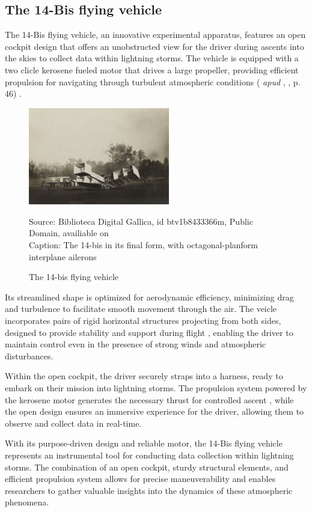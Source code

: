 \documentclass[english]{cenarticle}
\newcommand{\citeapud}[3]{
  (\citeauthor{#1} {\it apud} \citeauthor{#2}, \citeyear{#2}, p. #3)
}
\begin{document}
\subsection{The 14-Bis flying vehicle}
The 14-Bis flying vehicle, an innovative experimental apparatus, features an open cockpit design that offers an unobstructed view for the driver during ascents into the skies to collect data within lightning storms. The vehicle is equipped with a two clicle kerosene fueled motor \citep{Torrens1992} that drives a large propeller, providing efficient propulsion for navigating through turbulent atmospheric conditions \citeapud{Pimenta1987}{Torrens1992}{46}.
%
\begin{figure}[!h]
  \caption{The 14-bis flying vehicle}
  \vspace{-3mm} 
  \begin{center}
    \includegraphics[width=0.55\textwidth, trim={0 0 0 0},clip]{images/14-bis.jpeg}
  \end{center}
  {\footnotesize
  Source: Biblioteca Digital Gallica, id btv1b8433366m, Public Domain, availiable on \citep{Beau1907}\\
  Caption: The 14-bis in its final form, with octagonal-planform interplane ailerons}
    \label{fig:triangle2}
\end{figure}
%
Its streamlined shape is optimized for aerodynamic efficiency, minimizing drag and turbulence to facilitate smooth movement through the air. The veicle incorporates pairs of rigid horizontal structures projecting from both sides, designed to provide stability and support during flight \citep{Wipo}, enabling the driver to maintain control even in the presence of strong winds and atmospheric disturbances.\par
%
Within the open cockpit, the driver securely straps into a harness, ready to embark on their mission into lightning storms. The propulsion system powered by the kerosene motor generates the necessary thrust for controlled ascent \citep{Torrens1992}, while the open design ensures an immersive experience for the driver, allowing them to observe and collect data in real-time.\par
%
With its purpose-driven design and reliable motor, the 14-Bis flying vehicle represents an instrumental tool for conducting data collection within lightning storms. The combination of an open cockpit, sturdy structural elements, and efficient propulsion system allows for precise maneuverability and enables researchers to gather valuable insights into the dynamics of these atmospheric phenomena.
%
\end{document}
